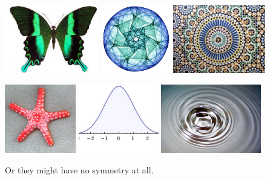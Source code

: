 \documentclass[12pt, reqno]{amsart}
\theoremstyle{remark}
\theoremstyle{definition}
\numberwithin{equation}{section}  %
\begin{document}
\begin{center}\label{pics:symm}
\includegraphics[height=3cm]{symm1}
\quad
\includegraphics[height=3cm]{symm2}
\quad
\includegraphics[height=3cm]{symm3}



\includegraphics[height=3cm]{symm4}
\quad
\includegraphics[height=3cm]{symm5}
\quad
\includegraphics[height=3cm]{symm6}
\end{center}

\bigskip

Or they might have no symmetry at all.
\end{document}

